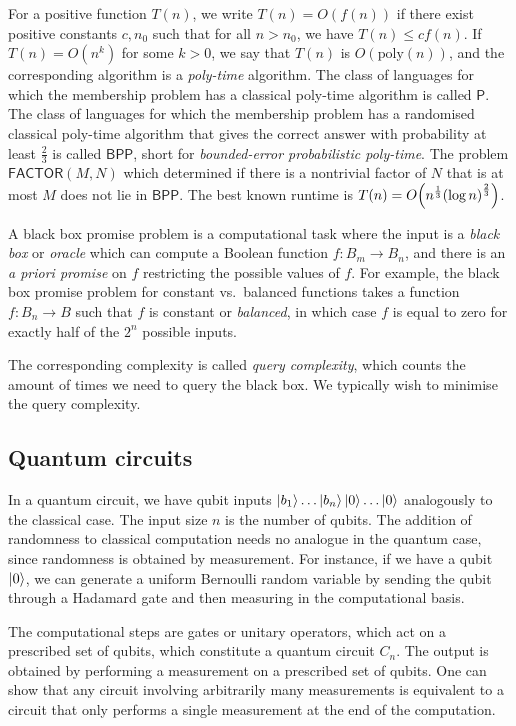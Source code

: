 For a positive function \( T(n) \), we write \( T(n) = O(f(n)) \) if there exist positive constants \( c, n_0 \) such that for all \( n > n_0 \), we have \( T(n) \leq cf(n) \).
If \( T(n) = O(n^k) \) for some \( k > 0 \), we say that \( T(n) \) is \( O(\mathrm{poly}(n)) \), and the corresponding algorithm is a \emph{poly-time} algorithm.
The class of languages for which the membership problem has a classical poly-time algorithm is called \( \mathsf{P} \).
The class of languages for which the membership problem has a randomised classical poly-time algorithm that gives the correct answer with probability at least \( \frac{2}{3} \) is called \( \mathsf{BPP} \), short for \emph{bounded-error probabilistic poly-time}.
The problem \( \mathsf{FACTOR}(M,N) \) which determined if there is a nontrivial factor of \( N \) that is at most \( M \) does not lie in \( \mathsf{BPP} \).
The best known runtime is \( T(n) = O\qty(n^{\frac{1}{3}}\qty(\log n)^\frac{2}{3}) \).

A black box promise problem is a computational task where the input is a \emph{black box} or \emph{oracle} which can compute a Boolean function \( f \colon B_m \to B_n \), and there is an \emph{a priori promise} on \( f \) restricting the possible values of \( f \).
For example, the black box promise problem for constant vs.\ balanced functions takes a function \( f \colon B_n \to B \) such that \( f \) is constant or \emph{balanced}, in which case \( f \) is equal to zero for exactly half of the \( 2^n \) possible inputs.

The corresponding complexity is called \emph{query complexity}, which counts the amount of times we need to query the black box.
We typically wish to minimise the query complexity.

\subsection{Quantum circuits}
In a quantum circuit, we have qubit inputs \( \ket{b_1} \dots \ket{b_n} \ket{0} \dots \ket{0} \) analogously to the classical case.
The input size \( n \) is the number of qubits.
The addition of randomness to classical computation needs no analogue in the quantum case, since randomness is obtained by measurement.
For instance, if we have a qubit \( \ket{0} \), we can generate a uniform Bernoulli random variable by sending the qubit through a Hadamard gate and then measuring in the computational basis.

The computational steps are gates or unitary operators, which act on a prescribed set of qubits, which constitute a quantum circuit \( C_n \).
The output is obtained by performing a measurement on a prescribed set of qubits.
One can show that any circuit involving arbitrarily many measurements is equivalent to a circuit that only performs a single measurement at the end of the computation.

